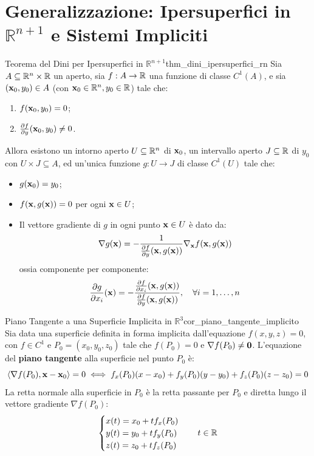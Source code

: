 \section{Generalizzazione: Ipersuperfici in \texorpdfstring{$\mathbb{R}^{n+1}$}{R\textasciicircum(n+1)} e Sistemi Impliciti}

\begin{teorema}{Teorema del Dini per Ipersuperfici in $\mathbb{R}^{n+1}$}{thm_dini_ipersuperfici_rn}
Sia $A \subseteq \mathbb{R}^n \times \mathbb{R}$ un aperto, sia $f: A \to \mathbb{R}$ una funzione di classe $C^1(A)$, e sia $(\mathbf{x}_0, y_0) \in A$ (con $\mathbf{x}_0 \in \mathbb{R}^n, y_0 \in \mathbb{R}$) tale che:
\begin{enumerate}
    \item $f(\mathbf{x}_0, y_0) = 0$;
    \item $\frac{\partial f}{\partial y}(\mathbf{x}_0, y_0) \neq 0$.
\end{enumerate}
Allora esistono un intorno aperto $U \subseteq \mathbb{R}^n$ di $\mathbf{x}_0$, un intervallo aperto $J \subseteq \mathbb{R}$ di $y_0$ con $U \times J \subseteq A$, ed un'unica funzione $g: U \to J$ di classe $C^1(U)$ tale che:
\begin{itemize}
    \item $g(\mathbf{x}_0) = y_0$;
    \item $f(\mathbf{x}, g(\mathbf{x})) = 0$ per ogni $\mathbf{x} \in U$;
    \item Il vettore gradiente di $g$ in ogni punto $\mathbf{x} \in U$ è dato da:
    \[
    \nabla g(\mathbf{x}) = -\frac{1}{\frac{\partial f}{\partial y}(\mathbf{x}, g(\mathbf{x}))} \nabla_{\mathbf{x}} f(\mathbf{x}, g(\mathbf{x}))
    \]
    ossia componente per componente:
    \[
    \frac{\partial g}{\partial x_i}(\mathbf{x}) = -\frac{\frac{\partial f}{\partial x_i}(\mathbf{x}, g(\mathbf{x}))}{\frac{\partial f}{\partial y}(\mathbf{x}, g(\mathbf{x}))}, \quad \forall i=1,\dots,n
    \]
\end{itemize}
\end{teorema}

\begin{corollario}{Piano Tangente a una Superficie Implicita in $\mathbb{R}^3$}{cor_piano_tangente_implicito}
Sia data una superficie definita in forma implicita dall'equazione $f(x, y, z) = 0$, con $f \in C^1$ e $P_0 = (x_0, y_0, z_0)$ tale che $f(P_0) = 0$ e $\nabla f(P_0) \neq \mathbf{0}$.
L'equazione del \textbf{piano tangente} alla superficie nel punto $P_0$ è:
\[
\langle\nabla f(P_0), \mathbf{x} - \mathbf{x}_0\rangle = 0 \iff f_x(P_0)(x - x_0) + f_y(P_0)(y - y_0) + f_z(P_0)(z - z_0) = 0
\]
La retta normale alla superficie in $P_0$ è la retta passante per $P_0$ e diretta lungo il vettore gradiente $\nabla f(P_0)$:
\[
\begin{cases} x(t) = x_0 + t f_x(P_0) \\ y(t) = y_0 + t f_y(P_0) \\ z(t) = z_0 + t f_z(P_0) \end{cases} \quad t \in \mathbb{R}
\]
\end{corollario}
